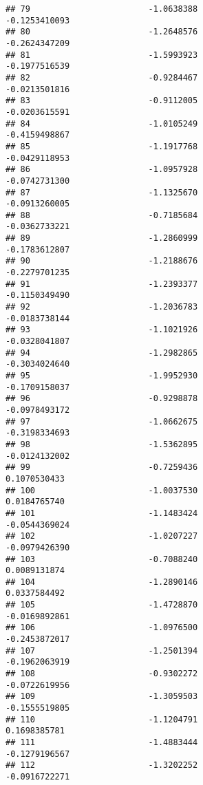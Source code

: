 \documentclass[
]{article}
\begin{document}
\begin{verbatim}
## 79                        -1.0638388                         -0.1253410093
## 80                        -1.2648576                         -0.2624347209
## 81                        -1.5993923                         -0.1977516539
## 82                        -0.9284467                         -0.0213501816
## 83                        -0.9112005                         -0.0203615591
## 84                        -1.0105249                         -0.4159498867
## 85                        -1.1917768                         -0.0429118953
## 86                        -1.0957928                         -0.0742731300
## 87                        -1.1325670                         -0.0913260005
## 88                        -0.7185684                         -0.0362733221
## 89                        -1.2860999                         -0.1783612807
## 90                        -1.2188676                         -0.2279701235
## 91                        -1.2393377                         -0.1150349490
## 92                        -1.2036783                         -0.0183738144
## 93                        -1.1021926                         -0.0328041807
## 94                        -1.2982865                         -0.3034024640
## 95                        -1.9952930                         -0.1709158037
## 96                        -0.9298878                         -0.0978493172
## 97                        -1.0662675                         -0.3198334693
## 98                        -1.5362895                         -0.0124132002
## 99                        -0.7259436                          0.1070530433
## 100                       -1.0037530                          0.0184765740
## 101                       -1.1483424                         -0.0544369024
## 102                       -1.0207227                         -0.0979426390
## 103                       -0.7088240                          0.0089131874
## 104                       -1.2890146                          0.0337584492
## 105                       -1.4728870                         -0.0169892861
## 106                       -1.0976500                         -0.2453872017
## 107                       -1.2501394                         -0.1962063919
## 108                       -0.9302272                         -0.0722619956
## 109                       -1.3059503                         -0.1555519805
## 110                       -1.1204791                          0.1698385781
## 111                       -1.4883444                         -0.1279196567
## 112                       -1.3202252                         -0.0916722271

\end{verbatim}
\end{document}
